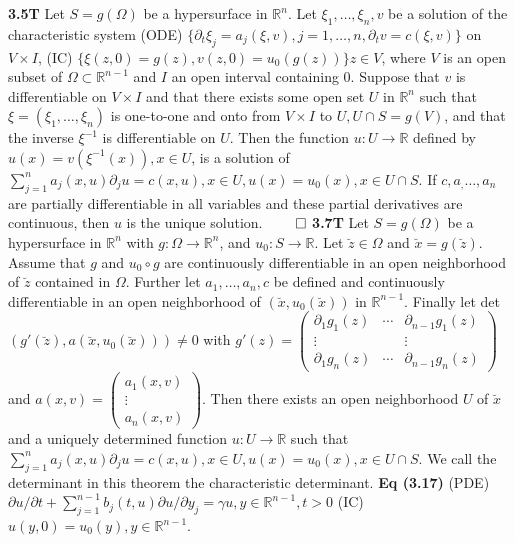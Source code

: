 \documentclass[6pt]{article}
\newcommand{\R}{\mathbb{R}}
\newcommand{\ra}{\rightarrow}
\begin{document}
\begin{multicols}{2}
{\bf 3.5T} Let $S=g(\Omega)$ be a hypersurface in $\R^n$. Let $\xi_1, \dots, \xi_n, v$ be a solution of the characteristic system (ODE) $\{\partial_t \xi_j=a_j(\xi,v), j=1,\dots, n, \partial_t v=c(\xi, v)\}$ on $V \times I$, (IC) $\{\xi(z,0)=g(z), v(z,0)=u_0(g(z))\} z \in V$, where $V$ is an open subset of $\Omega \subset \R^{n-1}$ and $I$ an open interval containing 0. Suppose that $v$ is differentiable on $V \times I$ and that there exists some open set $U$ in $\R^n$ such that $\xi=(\xi_1, \dots, \xi_n)$ is one-to-one and onto from $V\times I$ to $U, U \cap S = g(V)$, and that the inverse $\xi^{-1}$ is differentiable on $U$. Then the function $u: U\ra \R$ defined by $u(x)=v(\xi^{-1}(x)), x\in U$, is a solution of $\sum_{j=1}^na_j(x,u)\partial_ju=c(x,u), x \in U, u(x)=u_0(x), x\in U \cap S$. If $c, a_, \dots , a_n$ are partially differentiable in all variables and these partial derivatives are continuous, then $u$ is the unique solution. $\qed $
{\bf 3.7T} Let $S=g(\Omega)$ be a hypersurface in $\R^n$ with $g: \Omega \ra \R^n$, and $u_0: S\ra \R$. Let $\breve{z} \in \Omega$ and $\breve{x}=g(\breve{z})$. Assume that $g$ and $u_0 \circ g$ are continuously differentiable in an open neighborhood of $\breve{z}$ contained in $\Omega$. Further let $a_1, \dots, a_n, c$ be defined and continuously differentiable in an open neighborhood of $(\breve{x}, u_0(\breve{x}))$ in $\R^{n-1}$. Finally let det$(g'(\breve{z}), a(\breve{x}, u_0(\breve{x}))) \neq 0$ with $g'(z)=\begin{pmatrix}
  \partial_1g_1(z) &  \cdots &  \partial_{n-1}g_1(z) \\
  \vdots& &\vdots\\
  \partial_1g_n(z) &  \cdots &  \partial_{n-1}g_n(z) 
 \end{pmatrix}$ and $a(x,v)=
 \begin{pmatrix}
  a_1(x,v)  \\
  \vdots\\
   a_n(x,v) 
 \end{pmatrix}$. Then there exists an open neighborhood $U$ of $\breve{x}$ and a uniquely determined function $u: U\ra \R$ such that $\sum_{j=1}^n a_j(x,u)\partial_ju=c(x,u), x \in U, u(x)=u_0(x), x\in U \cap S$. We call the determinant in this theorem the characteristic determinant.
 {\bf Eq (3.17)} (PDE) $\partial u / \partial t + \sum_{j=1}^{n-1} b_j(t,u)\partial u / \partial y_j = \gamma u, y \in \R^{n-1}, t>0$ (IC) $u(y,0)=u_0(y), y \in \R^{n-1}$. 

\end{multicols}
\end{document}
